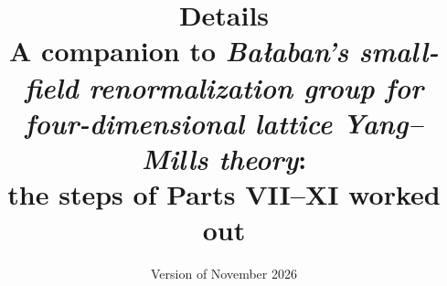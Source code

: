 

\title{\textbf{Details}\\[6pt]
\large A companion to \emph{Ba\l aban's small-field renormalization group for four-dimensional lattice Yang--Mills theory}:\\ the steps of Parts VII--XI worked out}
\author{}
\date{Version of November 2026}


\maketitle
\tableofcontents










\appendix




